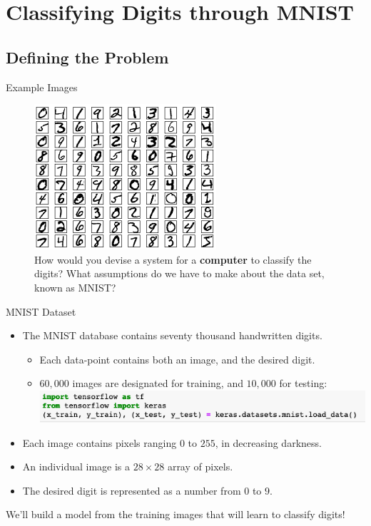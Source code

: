 \documentclass[xcolor=dvipsnames, fontsize=11pt, %
pagesize, %
parskip=half-, t]{beamer}
\begin{document}
\section{Classifying Digits through MNIST}
\subsection{Defining the Problem}
\begin{frame}[c]{Example Images}
\begin{figure} 
\center
\includegraphics{mnist_100_digits.png}
\caption{How would you devise a system for a \textbf{computer} to classify the digits? What assumptions do we have to make about the data set, known as MNIST? }
\end{figure}
\end{frame}

\begin{frame}[c]{MNIST Dataset}
\begin{itemize}
\item The MNIST database contains seventy thousand handwritten digits.  \pause 
\begin{itemize}
\item Each data-point contains both an image, and the desired digit.
\item $60,000$ images are designated for training, and $10,000$ for testing:
\includegraphics[scale=0.42]{load.png}
\end{itemize}
\item Each image contains pixels ranging $0$ to $255$, in decreasing darkness.
\item  An individual image is a $28\times 28$ array of pixels.\pause  
\item The desired digit is represented as a number from $0$ to $9$. \pause 
\end{itemize}
We'll build a model from the training images that will learn to classify digits!
\end{frame}
\end{document}
